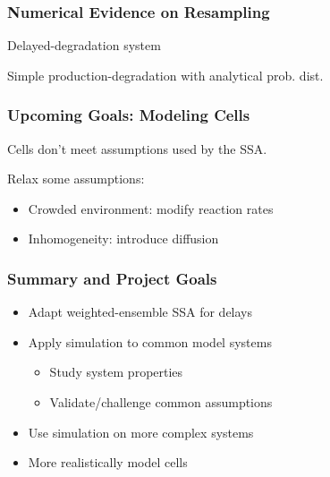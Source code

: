 \documentclass[xcolor={usenames,dvipsnames,svgnames}]{beamer}
\begin{document}
\begin{frame}
    \frametitle{Numerical Evidence on Resampling}
    \begin{overprint}
        \begin{center}
            \resizebox{0.48\textwidth}{!}{
                
            }
            \resizebox{0.48\textwidth}{!}{
                
            }
        \end{center}
        Delayed-degradation system
        \begin{center}
            \resizebox{0.48\textwidth}{!}{
                
            }
            \resizebox{0.48\textwidth}{!}{
                
            }
        \end{center}
        Simple production-degradation with analytical prob. dist.
    \end{overprint}
\end{frame}


\begin{frame}
    \frametitle{Upcoming Goals: Modeling Cells}
    Cells don't meet assumptions used by the SSA.

    Relax some assumptions:
    \begin{itemize}
        \item Crowded environment: modify reaction rates
        \item Inhomogeneity: introduce diffusion
    \end{itemize}
\end{frame}

\begin{frame}
    \frametitle{Summary and Project Goals}
    \begin{itemize}
        \item Adapt weighted-ensemble SSA for delays
        \item Apply simulation to common model systems
        \begin{itemize}
            \item Study system properties
            \item Validate/challenge common assumptions
        \end{itemize}
        \item Use simulation on more complex systems
        \item More realistically model cells
    \end{itemize}
\end{frame}
\end{document}
